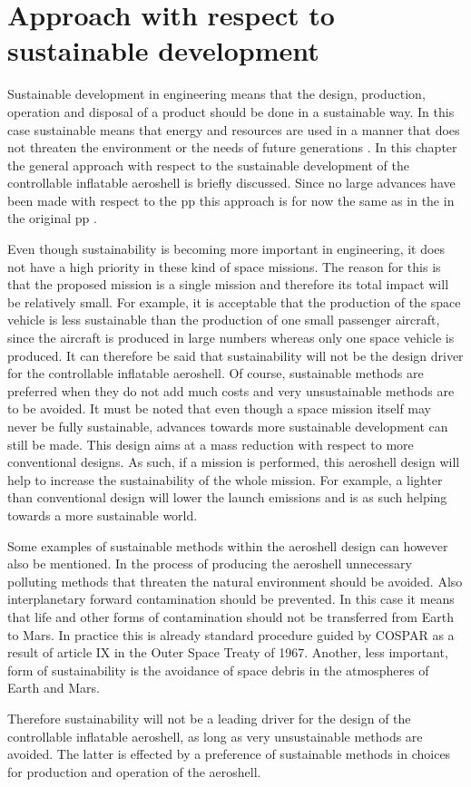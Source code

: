 \section{Approach with respect to sustainable development}\label{ch:sustain}


Sustainable development in engineering means that the design, production, operation and disposal of a product should be done in a sustainable way. In this case sustainable means that energy and resources are used in a manner that does not threaten the environment or the needs of future generations \cite{Masud2011}. In this chapter the general approach with respect to the sustainable development of the controllable inflatable aeroshell is briefly discussed. Since no large advances have been made with respect to the \acrfull{pp} this approach is for now the same as in the in the original \gls{pp} \cite{Balasooriyan2015}.

Even though sustainability is becoming more important in engineering, it does not have a high priority in these kind of space missions. The reason for this is that the proposed mission is a single mission and therefore its total impact will be relatively small. For example, it is acceptable that the production of the space vehicle is less sustainable than the production of one small passenger aircraft, since the aircraft is produced in large numbers whereas only one space vehicle is produced. It can therefore be said that sustainability will not be the design driver for the controllable inflatable aeroshell. Of course, sustainable methods are preferred when they do not add much costs and very unsustainable methods are to be avoided. It must be noted that even though a space mission itself may never be fully sustainable, advances towards more sustainable development can still be made. This design aims at a mass reduction with respect to more conventional designs. As such, if a mission is performed, this aeroshell design will help to increase the sustainability of the whole mission. For example, a lighter than conventional design will lower the launch emissions and is as such helping towards a more sustainable world.

Some examples of sustainable methods within the aeroshell design can however also be mentioned. In the process of producing the aeroshell unnecessary polluting methods that threaten the natural environment should be avoided. Also interplanetary forward contamination should be prevented. In this case it means that life and other forms of contamination should not be transferred from Earth to Mars. In practice this is already standard procedure guided by COSPAR as a result of article IX in the Outer Space Treaty of 1967. \cite{UnitedNations2008} Another, less important, form of sustainability is the avoidance of space debris in the atmospheres of Earth and Mars.

Therefore sustainability will not be a leading driver for the design of the controllable inflatable aeroshell, as long as very unsustainable methods are avoided. The latter is effected by a preference of sustainable methods in choices for production and operation of the aeroshell.